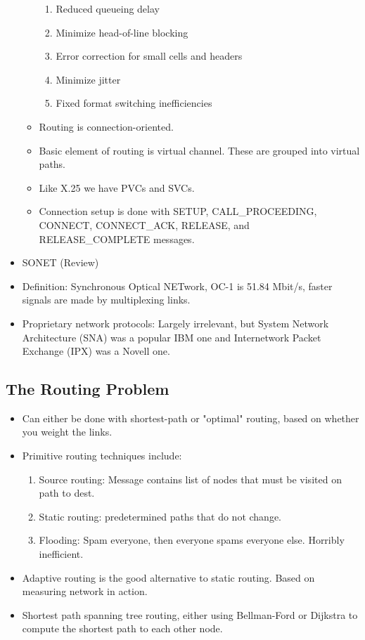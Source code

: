 \documentclass{scrartcl}
\begin{document}
\begin{itemize}
\begin{itemize}
\begin{enumerate}
\item Reduced queueing delay
\item Minimize head-of-line blocking
\item Error correction for small cells and headers
\item Minimize jitter
\item Fixed format switching inefficiencies
\end{enumerate}
\item Routing is connection-oriented.
\item Basic element of routing is virtual channel. These are grouped into 
virtual paths.
\item Like X.25 we have PVCs and SVCs.
\item Connection setup is done with SETUP, CALL\_PROCEEDING, CONNECT, 
CONNECT\_ACK, RELEASE, and RELEASE\_COMPLETE messages.
\end{itemize}
\item SONET (Review)
\item Definition: Synchronous Optical NETwork, OC-1 is 51.84 Mbit/s, faster 
signals are made by multiplexing links.
\item Proprietary network protocols: Largely irrelevant, but 
System Network Architecture (SNA) was a popular IBM one and 
Internetwork Packet Exchange (IPX) was a Novell one.
\end{itemize}
\subsection*{The Routing Problem}
\begin{itemize}
\item Can either be done with shortest-path or "optimal" routing, 
based on whether you weight the links.
\item Primitive routing techniques include:
\begin{enumerate}
\item Source routing: Message contains list of nodes that must be visited
 on path to dest.
\item Static routing: predetermined paths that do not change.
\item Flooding: Spam everyone, then everyone spams everyone else. Horribly 
inefficient.
\end{enumerate}
\item Adaptive routing is the good alternative to static routing. Based on
 measuring network in action.
\item Shortest path spanning tree routing, either using Bellman-Ford or 
Dijkstra to compute the shortest path to each other node.
\end{itemize}
\end{document}
